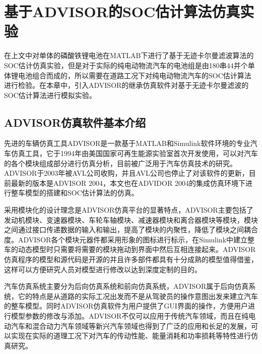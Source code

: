 
\chapter{基于ADVISOR的SOC估计算法仿真实验}
在上文中对单体的磷酸铁锂电池在MATLAB下进行了基于无迹卡尔曼滤波算法的SOC估计仿真实验，但是对于实际的纯电动物流汽车的电池组是由180串44并个单体锂电池组合而成的，所以需要在道路工况下对纯电动物流汽车的SOC估计算法进行检验。在本章中，引入ADVISOR的继承仿真软件对基于无迹卡尔曼滤波的SOC估计算法进行模拟实验。
\section{ADVISOR仿真软件基本介绍}
先进的车辆仿真工具ADVISOR是一款基于MATLAB和Simulink软件环境的专业汽车仿真工具，它于1994年由美国国家可再生能源实验室首次开发使用，可以对汽车的各个模块组成部分进行仿真分析，目前被广泛用于汽车仿真技术的研究。ADVISOR于2003年被AVL公司收购，并且AVL公司也停止了对该软件的更新，目前最新的版本是ADVISOR 2004，本文也在ADVIDOR 2004的集成仿真环境下进行整车模型的搭建和SOC估计算法的仿真。

采用模块化的设计理念是ADVISOR仿真平台的显著特点，ADVISOR主要包括了发动机模块、变速器模块、车轮车轴模块、减速器模块和离合器模块等模块，模块之间通过接口传递数据的输入和输出，提高了模块的内聚性，降低了模块之间耦合度。ADVISOR各个模块元器件都采用形象的图标进行标示，在Simulink中建立整车的动态模型时只需要将需要的模块拖动到界面中然后互相连接起来。ADVISOR仿真程序的模型和源代码是开源的并且许多部件都具有十分成熟的模型值得借鉴，这样可以方便研究人员对模型进行修改以达到深度定制的目的。

汽车仿真系统主要分为后向仿真系统和前向仿真系统，ADVISOR属于后向仿真系统，它的特点是从道路的实际工况出发而不是从驾驶员的操作意图出发来建立汽车的整车模型。同时ADVISOR仿真软件为用户提供了GUI界面的操作，方便用户进行模型参数的修改与添加。ADVISOR不仅可以应用于传统汽车领域，而且在纯电动汽车和混合动力汽车领域等新兴汽车领域也得到了广泛的应用和长足的发展，可以实现在实际的道理工况下对汽车的传动性能、能量消耗和功率损耗等特性进行仿真研究。
